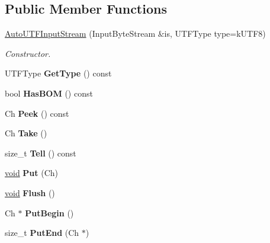 \subsection*{Public Member Functions}
\begin{DoxyCompactItemize}
\item 
\hyperlink{class_auto_u_t_f_input_stream_a83837fced0971ba26dd9a8ec1575abb0}{Auto\+U\+T\+F\+Input\+Stream} (Input\+Byte\+Stream \&is, U\+T\+F\+Type type=k\+U\+T\+F8)
\begin{DoxyCompactList}\small\item\em Constructor. \end{DoxyCompactList}\item 
\hypertarget{class_auto_u_t_f_input_stream_a4b8a3fa5d465a98ec93373cc88102d34}{}U\+T\+F\+Type {\bfseries Get\+Type} () const \label{class_auto_u_t_f_input_stream_a4b8a3fa5d465a98ec93373cc88102d34}

\item 
\hypertarget{class_auto_u_t_f_input_stream_a74bf5085aaefeb533cbe31719cb0be23}{}bool {\bfseries Has\+B\+O\+M} () const \label{class_auto_u_t_f_input_stream_a74bf5085aaefeb533cbe31719cb0be23}

\item 
\hypertarget{class_auto_u_t_f_input_stream_a091e55c06a8013b978c9bab05c9068e3}{}Ch {\bfseries Peek} () const \label{class_auto_u_t_f_input_stream_a091e55c06a8013b978c9bab05c9068e3}

\item 
\hypertarget{class_auto_u_t_f_input_stream_a652cd1ae8bd848a5ecce4efa1ebd0f38}{}Ch {\bfseries Take} ()\label{class_auto_u_t_f_input_stream_a652cd1ae8bd848a5ecce4efa1ebd0f38}

\item 
\hypertarget{class_auto_u_t_f_input_stream_a759b3d2690679ff9eef0c18cb2fbb0cf}{}size\+\_\+t {\bfseries Tell} () const \label{class_auto_u_t_f_input_stream_a759b3d2690679ff9eef0c18cb2fbb0cf}

\item 
\hypertarget{class_auto_u_t_f_input_stream_a5ea730d1ab715f58ce4f9e3dcd77810a}{}\hyperlink{_s_d_l__audio_8h_a52835ae37c4bb905b903cbaf5d04b05f}{void} {\bfseries Put} (Ch)\label{class_auto_u_t_f_input_stream_a5ea730d1ab715f58ce4f9e3dcd77810a}

\item 
\hypertarget{class_auto_u_t_f_input_stream_aecc08f52794d761fc1b729907a83dcf8}{}\hyperlink{_s_d_l__audio_8h_a52835ae37c4bb905b903cbaf5d04b05f}{void} {\bfseries Flush} ()\label{class_auto_u_t_f_input_stream_aecc08f52794d761fc1b729907a83dcf8}

\item 
\hypertarget{class_auto_u_t_f_input_stream_a761841842c147c0bb1a69bfacbc117a2}{}Ch $\ast$ {\bfseries Put\+Begin} ()\label{class_auto_u_t_f_input_stream_a761841842c147c0bb1a69bfacbc117a2}

\item 
\hypertarget{class_auto_u_t_f_input_stream_a41bd66602f82d344383792feac34f9f7}{}size\+\_\+t {\bfseries Put\+End} (Ch $\ast$)\label{class_auto_u_t_f_input_stream_a41bd66602f82d344383792feac34f9f7}

\end{DoxyCompactItemize}



